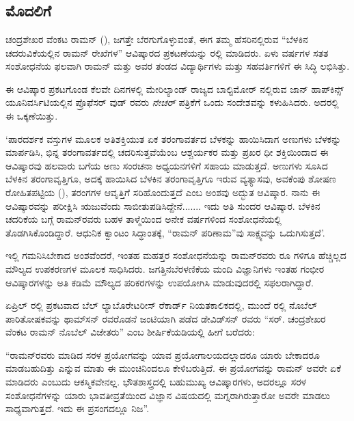 
\chapter{}

\section{ಮೊದಲಿಗೆ}

ಚಂದ್ರಶೇಖರ ವೆಂಕಟ ರಾಮನ್ (), ಜಗತ್ತೇ ಬೆರಗುಗೊಳ್ಳುವಂತೆ, ಈಗ ತಮ್ಮ ಹೆಸರಿನಲ್ಲಿರುವ “ಬೆಳಕಿನ ಚದರುವಿಕೆಯಲ್ಲಿನ ರಾಮನ್ ರೇಖೆಗಳ” ಆವಿಷ್ಕಾರದ ಪ್ರಕಟಣೆಯನ್ನು ರಲ್ಲಿ ಮಾಡಿದರು. ಏಳು ವರ್ಷಗಳ ಸತತ ಸಂಶೋಧನೆಯ ಫಲವಾಗಿ ರಾಮನ್ ಮತ್ತು ಅವರ ತಂಡದ ವಿದ್ಯಾರ್ಥಿಗಳು ಮತ್ತು ಸಹವರ್ತಿಗಳಿಗೆ ಈ ಸಿದ್ಧಿ ಲಭಿಸಿತ್ತು.

\vskip 2pt

ಈ ಆವಿಷ್ಕಾರ ಪ್ರಕಟಗೊಂಡ ಕೆಲವೇ ದಿನಗಳಲ್ಲಿ ಮೇರಿಲ್ಯಾಂಡ್ ರಾಜ್ಯದ ಬಾಲ್ಟಿಮೋರ್ ನಲ್ಲಿರುವ ಜಾನ್ ಹಾಪ್‍ಕಿನ್ಸ್ ಯೂನಿವರ್ಸಿಟಿಯಲ್ಲಿನ ಪ್ರೊಫೆಸರ್  ವುಡ್ ರವರು \textit{ನೇಚರ್} ಪತ್ರಿಕೆಗೆ ಒಂದು ಸಂದೇಶವನ್ನು ಕಳುಹಿಸಿದರು. ಅದರಲ್ಲಿ ಈ ಒಕ್ಕಣೆಯಿತ್ತು.

\vskip 2pt

‘ಪಾರದರ್ಶಕ ವಸ್ತುಗಳ ಮೂಲಕ ಅತಿಶಕ್ತಿಯುತ ಏಕ ತರಂಗಾವರ್ತದ ಬೆಳಕನ್ನು ಹಾಯಿಸಿದಾಗ ಅಣುಗಳು ಬೆಳಕನ್ನು ಮಾರ್ಪಡಿಸಿ, ಭಿನ್ನ ತರಂಗಾವರ್ತದಲ್ಲಿ ಚದರಿಸುತ್ತವೆಯೆಂಬ ಆಶ್ಚರ್ಯಕರ ಮತ್ತು ಪ್ರಖರ ಧೀ ಶಕ್ತಿಯಿಂದಾದ ಈ ಆವಿಷ್ಕಾರವು ಹಲವಾರು ಬಗೆಯ ಅಣು ಸಂರಚನಾ ಅಧ್ಯಯನಗಳಿಗೆ ಸಹಾಯ ಮಾಡುತ್ತದೆ. ಅಣುಗಳು ಸೂಸಿದ ಬೆಳಕಿನ ತರಂಗಾವೃತ್ತಿಗೂ, ಅದಕ್ಕೆ ಹಾಯಿಸಿದ ಬೆಳಕಿನ ತರಂಗಾವೃತ್ತಿಗೂ ಇರುವ ವ್ಯತ್ಯಾಸವು, ಅವಕೆಂಪು ಶೋಷಣ ರೋಹಿತಪಟ್ಟಿಯ (), ತರಂಗಗಳ ಆವೃತ್ತಿಗೆ ಸರಿಹೊಂದುತ್ತದೆ ಎಂಬ ಅಂಶವು ಅದ್ಭುತ ಆವಿಷ್ಕಾರ. ನಾನು ಈ ಆವಿಷ್ಕಾರವನ್ನು ಪರೀಕ್ಷಿಸಿ ಋಜುವೆಂದು ಸಾಬೀತುಪಡಿಸಿದ್ದೇನೆ....... ಇದು ಅತಿ ಸುಂದರ ಆವಿಷ್ಕಾರ. ಬೆಳಕಿನ ಚದರಿಕೆಯ ಬಗ್ಗೆ ರಾಮನ್‍ರವರು ಬಹಳ ತಾಳ್ಮೆಯಿಂದ ಅನೇಕ ವರ್ಷಗಳಿಂದ ಸಂಶೋಧನೆಯಲ್ಲಿ ತೊಡಗಿಸಿಕೊಂಡಿದ್ದಾರೆ. ಆಧುನಿಕ ಕ್ವಾಂಟಂ ಸಿದ್ಧಾಂತಕ್ಕೆ, “ರಾಮನ್ ಪರಿಣಾಮ”ವು ಸಾಕ್ಷ್ಯವನ್ನು ಒದುಗಿಸುತ್ತದೆ’.

\vskip 2pt

ಇಲ್ಲಿ ಗಮನಿಸಿಬೇಕಾದ ಅಂಶವೆಂದರೆ, ಇಂತಹ ಮಹತ್ತರ ಸಂಶೋಧನೆಯನ್ನು ರಾಮನ್‍\break ರವರು  ರೂ ಗಳಿಗೂ ಹೆಚ್ಚಿಲ್ಲದ ಮೌಲ್ಯದ ಉಪಕರಣಗಳ ಮೂಲಕ ಸಾಧಿಸಿದರು. ಜಗತ್ತಿನ\break ಬೆರಳಣಿಕೆಯ ಮಂದಿ ವಿಜ್ಞಾನಿಗಳು ಇಂತಹ ಗಂಭೀರ ಆವಿಷ್ಕಾರಗಳನ್ನು ಅತಿ ಕಡಿಮೆ ಮೌಲ್ಯದ ಪರಿಕರಗಳನ್ನು ಉಪಯೋಗಿಸಿ ಮಾಡುವುದರಲ್ಲಿ ಸಫಲರಾಗಿದ್ದಾರೆ.

ಏಪ್ರಿಲ್ ರಲ್ಲಿ ಪ್ರಕಟವಾದ ಬೆಲ್ ಲ್ಯಾಬೊರೇಟರೀಸ್ ರೆಕಾರ್ಡ್ ನಿಯತಕಾಲಿಕದಲ್ಲಿ, ಮುಂದೆ ರಲ್ಲಿ ನೊಬೆಲ್ ಪಾರಿತೋಷಕವನ್ನು  ಥಾಮ್‍ಸನ್ ರವರೊಡನೆ ಜಂಟಿಯಾಗಿ ಪಡೆದ  ಡೇವಿಡ್‍ಸನ್ ರವರು “ಸರ್. ಚಂದ್ರಶೇಖರ ವೆಂಕಟ ರಾಮನ್ ನೊಬೆಲ್ ವಿಜೇತರು” ಎಂಬ ಶೀರ್ಷಿಕೆಯಡಿಯಲ್ಲಿ ಹೀಗೆ ಬರೆದರು:\enginline{-}

“ರಾಮನ್‍ರವರು ಮಾಡಿದ ಸರಳ ಪ್ರಯೋಗವನ್ನು ಯಾವ ಪ್ರಯೋಗಾಲಯದಲ್ಲಾದರೂ ಯಾರು ಬೇಕಾದರೂ ಮಾಡಬಹುದಿತ್ತು ಎನ್ನುವ ಮಾತು ಈ ಮುಂಚಿನಿಂದಲೂ ಕೇಳಿಬರುತ್ತಿದೆ. ಈ ಪ್ರಯೋಗವನ್ನು ರಾಮನ್ ಅವರೇ ಏಕೆ ಮಾಡಿದರು ಎಂಬುದು ಆಕಸ್ಮಿಕವೇನಲ್ಲ. ಭೌತಶಾಸ್ತ್ರದಲ್ಲಿ ಬಹುಮುಖ್ಯ ಆವಿಷ್ಕಾರಗಳು, ಅದರಲ್ಲೂ ಸರಳ ಸಂಶೋಧನೆಗಳನ್ನು ಯಾರು ಭಾವತೀವ್ರತೆಯಿಂದ ವಿಜ್ಞಾನ ವಿಷಯದಲ್ಲಿ ಮಗ್ನರಾಗಿರುತ್ತಾರೋ ಅವರೇ ಮಾಡಲು ಸಾಧ್ಯವಾಗುತ್ತದೆ. ಇದು ಈ ಪ್ರಸಂಗದಲ್ಲೂ ನಿಜ”.

